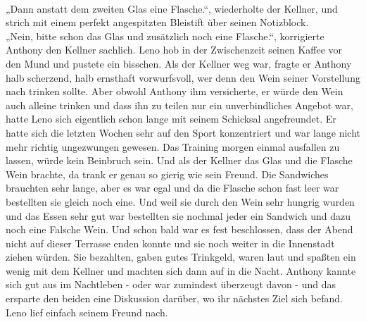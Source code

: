\documentclass[ngerman,smalldemyvopaper,11pt,oneside,onecolumn,openright,extrafontsizes]{memoir}
\begin{document}
\vspace{0.5em} \\
„Dann anstatt dem zweiten Glas eine Flasche.“, wiederholte der Kellner, und strich mit einem perfekt angespitzten Bleistift über seinen Notizblock.
\vspace{0.5em} \\
„Nein, bitte schon das Glas und zusätzlich noch eine Flasche.“, korrigierte Anthony den Kellner sachlich. Leno hob in der Zwischenzeit seinen Kaffee vor den Mund und pustete ein bisschen. Als der Kellner weg war, fragte er Anthony halb scherzend, halb ernsthaft vorwurfsvoll, wer denn den Wein seiner Vorstellung nach trinken sollte. Aber obwohl Anthony ihm versicherte, er würde den Wein auch alleine trinken und dass ihn zu teilen nur ein unverbindliches Angebot war, hatte Leno sich eigentlich schon lange mit seinem Schicksal angefreundet. Er hatte sich die letzten Wochen sehr auf den Sport konzentriert und war lange nicht mehr richtig ungezwungen gewesen. Das Training morgen einmal ausfallen zu lassen, würde kein Beinbruch sein. Und als der Kellner das Glas und die Flasche Wein brachte, da trank er genau so gierig wie sein Freund. Die Sandwiches brauchten sehr lange, aber es war egal und da die Flasche schon fast leer war bestellten sie gleich noch eine. Und weil sie durch den Wein sehr hungrig wurden und das Essen sehr gut war bestellten sie nochmal jeder ein Sandwich und dazu noch eine Falsche Wein. Und schon bald war es fest beschlossen, dass der Abend nicht auf dieser Terrasse enden konnte und sie noch weiter in die Innenstadt ziehen würden. Sie bezahlten, gaben gutes Trinkgeld, waren laut und spaßten ein wenig mit dem Kellner und machten sich dann auf in die Nacht. Anthony kannte sich gut aus im Nachtleben - oder war zumindest überzeugt davon - und das ersparte den beiden eine Diskussion darüber, wo ihr nächstes Ziel sich befand. Leno lief einfach seinem Freund nach.
\end{document}
